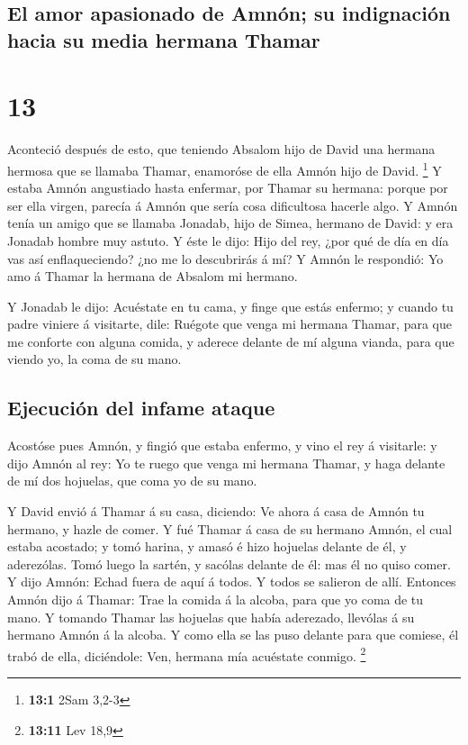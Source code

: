 \hypertarget{el-amor-apasionado-de-amnuxf3n-su-indignaciuxf3n-hacia-su-media-hermana-thamar}{%
\subsection{El amor apasionado de Amnón; su indignación hacia su media
hermana
Thamar}\label{el-amor-apasionado-de-amnuxf3n-su-indignaciuxf3n-hacia-su-media-hermana-thamar}}

\hypertarget{section-12}{%
\section{13}\label{section-12}}

 Aconteció después de esto, que teniendo Absalom hijo de
David una hermana hermosa que se llamaba Thamar, enamoróse de ella Amnón
hijo de David. \footnote{\textbf{13:1} 2Sam 3,2-3}  Y
estaba Amnón angustiado hasta enfermar, por Thamar su hermana: porque
por ser ella virgen, parecía á Amnón que sería cosa dificultosa hacerle
algo.  Y Amnón tenía un amigo que se llamaba Jonadab, hijo
de Simea, hermano de David: y era Jonadab hombre muy astuto.
 Y éste le dijo: Hijo del rey, ¿por qué de día en día vas
así enflaqueciendo? ¿no me lo descubrirás á mí? Y Amnón le respondió: Yo
amo á Thamar la hermana de Absalom mi hermano.

 Y Jonadab le dijo: Acuéstate en tu cama, y finge que
estás enfermo; y cuando tu padre viniere á visitarte, dile: Ruégote que
venga mi hermana Thamar, para que me conforte con alguna comida, y
aderece delante de mí alguna vianda, para que viendo yo, la coma de su
mano.

\hypertarget{ejecuciuxf3n-del-infame-ataque}{%
\subsection{Ejecución del infame
ataque}\label{ejecuciuxf3n-del-infame-ataque}}

 Acostóse pues Amnón, y fingió que estaba enfermo, y vino
el rey á visitarle: y dijo Amnón al rey: Yo te ruego que venga mi
hermana Thamar, y haga delante de mí dos hojuelas, que coma yo de su
mano.

 Y David envió á Thamar á su casa, diciendo: Ve ahora á
casa de Amnón tu hermano, y hazle de comer.  Y fué Thamar
á casa de su hermano Amnón, el cual estaba acostado; y tomó harina, y
amasó é hizo hojuelas delante de él, y aderezólas.  Tomó
luego la sartén, y sacólas delante de él: mas él no quiso comer. Y dijo
Amnón: Echad fuera de aquí á todos. Y todos se salieron de allí.
 Entonces Amnón dijo á Thamar: Trae la comida á la
alcoba, para que yo coma de tu mano. Y tomando Thamar las hojuelas que
había aderezado, llevólas á su hermano Amnón á la alcoba.
 Y como ella se las puso delante para que comiese, él
trabó de ella, diciéndole: Ven, hermana mía acuéstate conmigo.
\footnote{\textbf{13:11} Lev 18,9}

